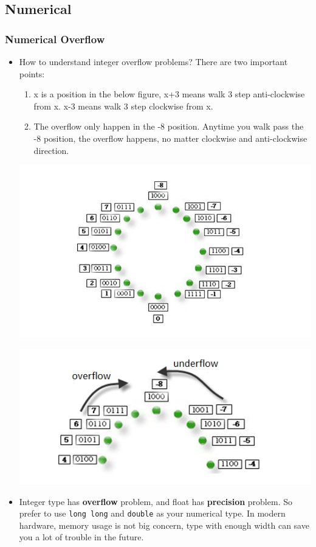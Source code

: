 \documentclass[a4paper,11pt,twoside]{book}
\begin{document}
\subsection{Numerical}
\subsubsection{Numerical Overflow}

\begin{itemize}
		\item How to understand integer overflow problems? There are two important points:
		\begin{enumerate}
				\item x is a position in the below figure, x+3 means walk 3 step anti-clockwise from x. x-3 means walk 3 step clockwise from x.
				\item The overflow only happen in the -8 position. Anytime you walk pass the -8 position, the overflow happens, no matter clockwise and anti-clockwise direction. 
		\end{enumerate}

\begin{center}
	\includegraphics[width=0.6\linewidth]{pics/integer.png}
	
	\includegraphics[width=0.6\linewidth]{pics/integer1.png}
\end{center}

	\item Integer type has \textbf{overflow} problem, and float has \textbf{precision} problem. So prefer to use \texttt{long long} and \texttt{double} as your numerical type. In modern hardware, memory usage is not big concern, type with enough width can save you a lot of trouble in the future. 
	

\end{itemize}
\end{document}
